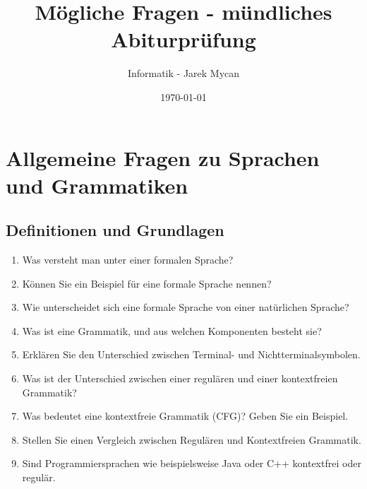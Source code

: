\documentclass[a4paper,12pt]{article}
\begin{document}
	
	\title{Mögliche Fragen - mündliches Abiturprüfung}
	\author{Informatik - Jarek Mycan}
	\date{\today}
	\maketitle
	
	\section{Allgemeine Fragen zu Sprachen und Grammatiken}
	
	\subsection*{Definitionen und Grundlagen}
	\begin{enumerate}
		\item Was versteht man unter einer formalen Sprache?
		\item Können Sie ein Beispiel für eine formale Sprache nennen?
		\item Wie unterscheidet sich eine formale Sprache von einer natürlichen Sprache?
		\item Was ist eine Grammatik, und aus welchen Komponenten besteht sie?
		\item Erklären Sie den Unterschied zwischen Terminal- und Nichtterminalsymbolen.
		\item Was ist der Unterschied zwischen einer regulären und einer kontextfreien Grammatik?
		\item Was bedeutet eine \glqq kontextfreie Grammatik\grqq{} (CFG)? Geben Sie ein Beispiel.
		\item Stellen Sie einen Vergleich zwischen Regulären  und Kontextfreien Grammatik.
		\item Sind Programmiersprachen wie beispielsweise Java oder C++ kontextfrei oder regulär.
	\end{enumerate}
	
	
	
	
\end{document}
